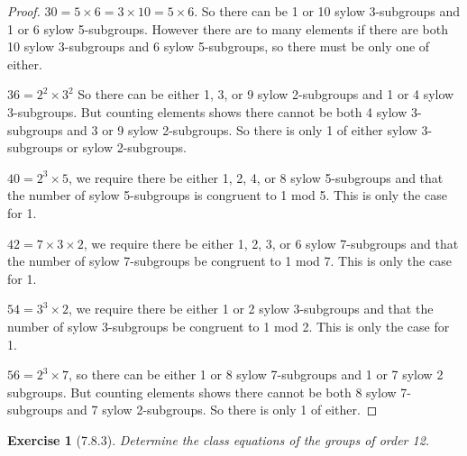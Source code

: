 \documentclass[12pt]{article}
\newtheorem*{exer}{Exercise}
\begin{document}
\begin{proof}
     $30 = 5 \times 6 = 3 \times 10 = 5 \times 6$. So there can be 1 or
     10 sylow 3-subgroups and 1 or 6 sylow 5-subgroups. However there
     are to many elements if there are both 10 sylow 3-subgroups and 6
     sylow 5-subgroups, so there must be only one of either.

     $36 = 2^2 \times 3^2$ So there can be either 1, 3, or 9 sylow
     2-subgroups and 1 or 4 sylow 3-subgroups. But counting elements
     shows there cannot be both 4 sylow 3-subgroups and 3 or 9 sylow
     2-subgroups. So there is only 1 of either sylow 3-subgroups or
     sylow 2-subgroups.

     $40 = 2^3 \times 5$, we require there be either 1, 2, 4, or 8 sylow
     5-subgroups and that the number of sylow 5-subgroups is congruent
     to 1 mod 5. This is only the case for 1.

     $42 = 7 \times 3 \times 2$, we require there be either 1, 2, 3, or
     6 sylow 7-subgroups and that the number of sylow 7-subgroups be
     congruent to 1 mod 7. This is only the case for 1.

     $54 = 3^3 \times 2$, we require there be either 1 or 2 sylow
     3-subgroups and that the number of sylow 3-subgroups be congruent
     to 1 mod 2. This is only the case for 1.

     $56 = 2^3 \times 7$, so there can be either 1 or 8 sylow
     7-subgroups and 1 or 7 sylow 2 subgroups. But counting elements
     shows there cannot be both 8 sylow 7-subgroups and 7 sylow
     2-subgroups. So there is only 1 of either.

\end{proof}


\begin{exer}[7.8.3]

    Determine the class equations of the groups of order 12.

\end{exer}
\end{document}
